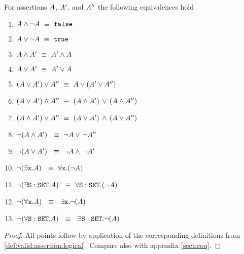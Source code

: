\vspace{-0.25in} %
 
 \begin{lemma}
 \label{lemma:classic:two}
For     assertions $A$, $A'$, and $A''$ the following equivalences hold
\label{lemma:basic_assertions_classical}
\begin{enumerate}
\item
$ A \wedge\neg A \ \equiv \  {\mbox{\tt{false}}}$
\item
$ A \vee \neg A   \ \equiv \  {\mbox{\tt{true}}}$
\item
$ A \wedge A'  \ \equiv \  A' \wedge A$
\item
$ A \vee A'  \ \equiv \  A' \vee A$
\item
$(A \vee A') \vee A'' \ \equiv \  A \vee (A' \vee A'')$
\item
$(A \vee A') \wedge A'' \ \equiv \  (A \wedge A')\, \vee\, (A \wedge A'')$
\item
$(A \wedge A') \vee A'' \ \equiv \  (A \vee A')\, \wedge\, (A \vee A'')$
\item
$\neg (A \wedge A') \  \ \equiv \  \neg  A   \vee\, \neg A''$
\item
$\neg (A \vee A') \  \ \equiv \  \neg  A   \wedge\, \neg A'$
\item
$\neg (\exists \prg{x}.\A )  \  \ \equiv \  \forall \prg{x}.(\neg  \A)$
\item
$\neg (\exists {\mbox{\tt{S}}}:{\mbox{\tt{SET}}}.A )  \  \ \equiv \  \forall {\mbox{\tt{S}}}:{\mbox{\tt{SET}}}.(\neg  A)$
\item
$\neg (\forall \prg{x}. \A)  \  \ \equiv \  \  \exists \prg{x}.\neg(\A )$
\item
$\neg (\forall {\mbox{\tt{S}}}:{\mbox{\tt{SET}}}. A)  \  \ \equiv \  \  \exists {\mbox{\tt{S}}}:{\mbox{\tt{SET}}}.\neg(A )$
\end{enumerate}
\end{lemma}
\begin{proof}
All points follow by application of the corresponding definitions from \ref{def:valid:assertion:logical}. %
Compare also with appendix \ref{sect:coq}.
 \end{proof}

